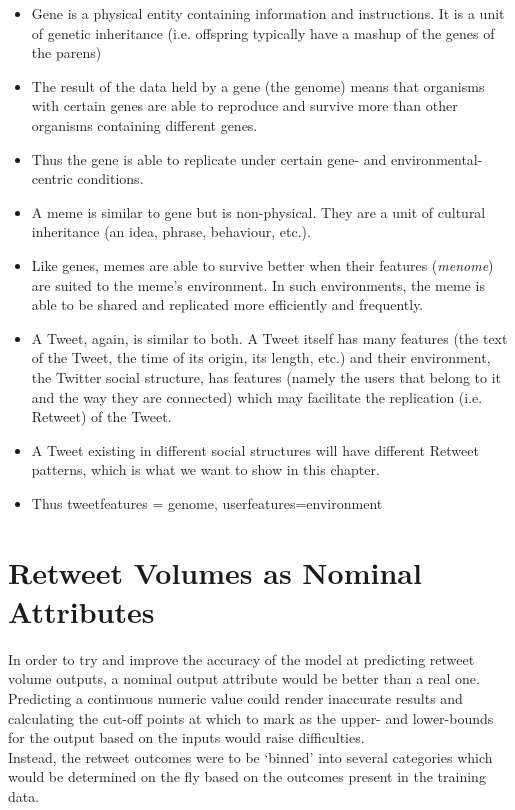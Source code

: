 \begin{itemize}
\item Gene is a physical entity containing information and instructions. It is a unit of genetic inheritance (i.e. offspring typically have a mashup of the genes of the parens)
\item The result of the data held by a gene (the genome) means that organisms with certain genes are able to reproduce and survive more than other organisms containing different genes.
\item Thus the gene is able to replicate under certain gene- and environmental-centric conditions.
\item A meme is similar to  gene but is non-physical. They are a unit of cultural inheritance (an idea, phrase, behaviour, etc.).
\item Like genes, memes are able to survive better when their features (\textit{menome}) are suited to the meme's environment. In such environments, the meme is able to be shared and replicated more efficiently and frequently.
\item A Tweet, again, is similar to both. A Tweet itself has many features (the text of the Tweet, the time of its origin, its length, etc.) and their environment, the Twitter social structure, has features (namely the users that belong to it and the way they are connected) which may facilitate the replication (i.e. Retweet) of the Tweet.
\item A Tweet existing in different social structures will have different Retweet patterns, which is what we want to show in this chapter.
\item Thus tweetfeatures = genome, userfeatures=environment
\end{itemize}


\section{Retweet Volumes as Nominal Attributes}
In order to try and improve the accuracy of the model at predicting retweet volume outputs, a nominal output attribute would be better than a real one. Predicting a continuous numeric value could render inaccurate results and calculating the cut-off points at which to mark as the upper- and lower-bounds for the output based on the inputs would raise difficulties.
\\
Instead, the retweet outcomes were to be `binned' into several categories which would be determined on the fly based on the outcomes present in the training data.\\

